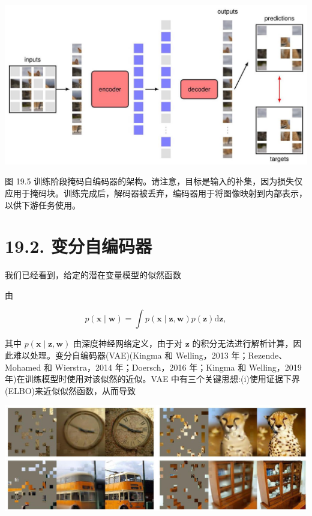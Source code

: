 \documentclass[10pt]{report}
\begin{document}
\begin{center}
\includegraphics[max width=1.0\textwidth]{images/0194e279-9b28-703a-88f4-c3ac21e2010d_588_201_348_1327_700_0.jpg}
\end{center}
\hspace*{3em} 

图 19.5 训练阶段掩码自编码器的架构。请注意，目标是输入的补集，因为损失仅应用于掩码块。训练完成后，解码器被丢弃，编码器用于将图像映射到内部表示，以供下游任务使用。

\section*{19.2. 变分自编码器}

我们已经看到，给定的潜在变量模型的似然函数

由

\[
p\left( {\mathbf{x} \mid  \mathbf{w}}\right)  = \int p\left( {\mathbf{x} \mid  \mathbf{z},\mathbf{w}}\right) p\left( \mathbf{z}\right) \mathrm{d}\mathbf{z}, \tag{19.4}
\]

其中 \(p\left( {\mathbf{x} \mid  \mathbf{z},\mathbf{w}}\right)\) 由深度神经网络定义，由于对 \(\mathbf{z}\) 的积分无法进行解析计算，因此难以处理。变分自编码器(VAE)(Kingma 和 Welling，2013 年；Rezende、Mohamed 和 Wierstra，2014 年；Doersch，2016 年；Kingma 和 Welling，2019 年)在训练模型时使用对该似然的近似。VAE 中有三个关键思想:(i)使用证据下界(ELBO)来近似似然函数，从而导致

\begin{center}
\includegraphics[max width=1.0\textwidth]{images/0194e279-9b28-703a-88f4-c3ac21e2010d_589_250_368_1296_455_0.jpg}
\end{center}
\hspace*{3em} 
\end{document}
